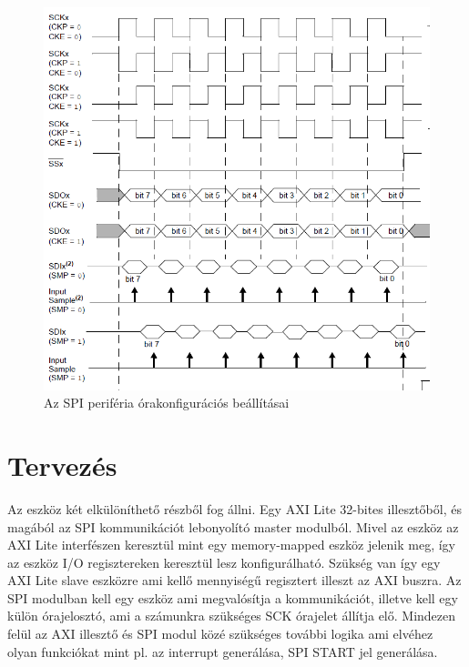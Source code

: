 \documentclass[a4paper,11pt]{article}
\begin{document}
\begin{figure}[H]
	\begin{center}
	\includegraphics[scale=2]{spi_clkdiag.png}
	\caption{Az SPI periféria órakonfigurációs beállításai}
	\label{fig:spi_clkdiag}
	\end{center}
\end{figure}

\section{Tervezés}
Az eszköz két elkülöníthető részből fog állni. Egy AXI Lite 32-bites illesztőből, és magából az SPI kommunikációt lebonyolító master modulból. Mivel az eszköz az AXI Lite interfészen keresztül mint egy memory-mapped eszköz jelenik meg, így az eszköz I/O regisztereken keresztül lesz konfigurálható. Szükség van így egy AXI Lite slave eszközre ami kellő mennyiségű regisztert illeszt az AXI buszra. Az SPI modulban kell egy eszköz ami megvalósítja a kommunikációt, illetve kell egy külön órajelosztó, ami a számunkra szükséges SCK órajelet állítja elő. Mindezen felül az AXI illesztő és SPI modul közé szükséges további logika ami elvéhez olyan funkciókat mint pl. az interrupt generálása, SPI START jel generálása.
\end{document}
